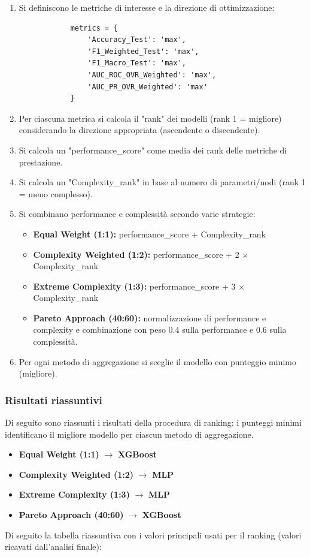 \documentclass[a4paper,12pt]{report}
\begin{document}
	\begin{enumerate}
		\item Si definiscono le metriche di interesse e la direzione di ottimizzazione:
		\begin{verbatim}
			metrics = {
				'Accuracy_Test': 'max',
				'F1_Weighted_Test': 'max',
				'F1_Macro_Test': 'max',
				'AUC_ROC_OVR_Weighted': 'max',
				'AUC_PR_OVR_Weighted': 'max'
			}
		\end{verbatim}
		\item Per ciascuna metrica si calcola il "rank" dei modelli (rank 1 = migliore) considerando la direzione appropriata (ascendente o discendente).
		\item Si calcola un "performance\_score" come media dei rank delle metriche di prestazione.
		\item Si calcola un "Complexity\_rank" in base al numero di parametri/nodi (rank 1 = meno complesso).
		\item Si combinano performance e complessità secondo varie strategie:
		\begin{itemize}
			\item \textbf{Equal Weight (1:1):} performance\_score + Complexity\_rank
			\item \textbf{Complexity Weighted (1:2):} performance\_score + 2 $\times$ Complexity\_rank
			\item \textbf{Extreme Complexity (1:3):} performance\_score + 3 $\times$ Complexity\_rank
			\item \textbf{Pareto Approach (40:60):} normalizzazione di performance e complexity e combinazione con peso 0.4 sulla performance e 0.6 sulla complessità.
		\end{itemize}
		\item Per ogni metodo di aggregazione si sceglie il modello con punteggio minimo (migliore).
	\end{enumerate}
	
	\subsubsection{Risultati riassuntivi}
	Di seguito sono riassunti i risultati della procedura di ranking: i punteggi minimi identificano il migliore modello per ciascun metodo di aggregazione.
	
	\begin{itemize}
		\item \textbf{Equal Weight (1:1)} $\rightarrow$ \textbf{XGBoost}
		\item \textbf{Complexity Weighted (1:2)} $\rightarrow$ \textbf{MLP}
		\item \textbf{Extreme Complexity (1:3)} $\rightarrow$ \textbf{MLP}
		\item \textbf{Pareto Approach (40:60)} $\rightarrow$ \textbf{XGBoost}
	\end{itemize}
	Di seguito la tabella riassuntiva con i valori principali usati per il ranking (valori ricavati dall'analisi finale):
	
\end{document}
